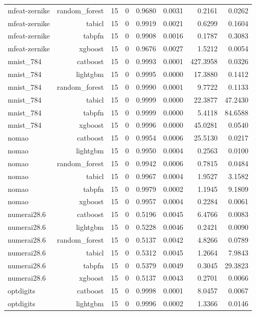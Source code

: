 \begin{table}[htbp]
\begin{tabular}{lrrrrrrr}
mfeat-zernike & random\_forest & 15 & 0 & 0.9680 & 0.0031 & 0.2161 & 0.0262 \\
mfeat-zernike & tabicl & 15 & 0 & 0.9919 & 0.0021 & 0.6299 & 0.1604 \\
mfeat-zernike & tabpfn & 15 & 0 & 0.9908 & 0.0016 & 0.1787 & 0.3083 \\
mfeat-zernike & xgboost & 15 & 0 & 0.9676 & 0.0027 & 1.5212 & 0.0054 \\
mnist\_784 & catboost & 15 & 0 & 0.9993 & 0.0001 & 427.3958 & 0.0326 \\
mnist\_784 & lightgbm & 15 & 0 & 0.9995 & 0.0000 & 17.3880 & 0.1412 \\
mnist\_784 & random\_forest & 15 & 0 & 0.9990 & 0.0001 & 9.7722 & 0.1133 \\
mnist\_784 & tabicl & 15 & 0 & 0.9999 & 0.0000 & 22.3877 & 47.2430 \\
mnist\_784 & tabpfn & 15 & 0 & 0.9999 & 0.0000 & 5.4118 & 84.6588 \\
mnist\_784 & xgboost & 15 & 0 & 0.9996 & 0.0000 & 45.0281 & 0.0540 \\
nomao & catboost & 15 & 0 & 0.9954 & 0.0006 & 25.5130 & 0.0217 \\
nomao & lightgbm & 15 & 0 & 0.9950 & 0.0004 & 0.2563 & 0.0100 \\
nomao & random\_forest & 15 & 0 & 0.9942 & 0.0006 & 0.7815 & 0.0484 \\
nomao & tabicl & 15 & 0 & 0.9967 & 0.0004 & 1.9527 & 3.1582 \\
nomao & tabpfn & 15 & 0 & 0.9979 & 0.0002 & 1.1945 & 9.1809 \\
nomao & xgboost & 15 & 0 & 0.9957 & 0.0004 & 0.2284 & 0.0061 \\
numerai28.6 & catboost & 15 & 0 & 0.5196 & 0.0045 & 6.4766 & 0.0083 \\
numerai28.6 & lightgbm & 15 & 0 & 0.5228 & 0.0046 & 0.2421 & 0.0090 \\
numerai28.6 & random\_forest & 15 & 0 & 0.5137 & 0.0042 & 4.8266 & 0.0789 \\
numerai28.6 & tabicl & 15 & 0 & 0.5312 & 0.0045 & 1.2664 & 7.9843 \\
numerai28.6 & tabpfn & 15 & 0 & 0.5379 & 0.0049 & 0.3045 & 29.3823 \\
numerai28.6 & xgboost & 15 & 0 & 0.5137 & 0.0043 & 0.2701 & 0.0066 \\
optdigits & catboost & 15 & 0 & 0.9998 & 0.0001 & 8.0457 & 0.0067 \\
optdigits & lightgbm & 15 & 0 & 0.9996 & 0.0002 & 1.3366 & 0.0146 \\

\end{tabular}
\end{table}
